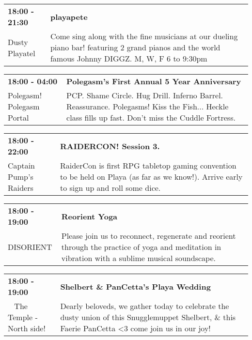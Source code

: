 \begin{tabular}{ p{1in} p{2.2in} }
    \textbf{18:00 - 21:30} & \textbf{playapete} \\
    Dusty Playatel \newline  & Come sing along with the fine musicians at our dueling piano bar! featuring 2 grand pianos and the world famous Johnny DIGGZ.  M, W, F  6 to 9:30pm \\
    \hline 
\end{tabular}
    
\begin{tabular}{ p{1in} p{2.2in} }
    \textbf{18:00 - 04:00} & \textbf{Polegasm's First Annual 5 Year Anniversary} \\
    Polegasm! \newline Polegasm Portal & PCP. Shame Circle. Hug Drill.
 Inferno Barrel. Reassurance. Polegasms!
Kiss the Fish...  Heckle class fills up fast. Don't miss the Cuddle Fortress. \\
    \hline 
\end{tabular}
    
\begin{tabular}{ p{1in} p{2.2in} }
    \textbf{18:00 - 22:00} & \textbf{RAIDERCON! Session 3.} \\
    Captain Pump's Raiders \newline  & RaiderCon is first RPG tabletop gaming convention to be held on Playa (as far as we know!). Arrive early to sign up and roll some dice. \\
    \hline 
\end{tabular}
    
\begin{tabular}{ p{1in} p{2.2in} }
    \textbf{18:00 - 19:00} & \textbf{Reorient Yoga} \\
    DISORIENT \newline  & Please join us to reconnect, regenerate and reorient through the practice of yoga and meditation in vibration with a sublime musical soundscape. \\
    \hline 
\end{tabular}
    
\begin{tabular}{ p{1in} p{2.2in} }
    \textbf{18:00 - 19:00} & \textbf{{\char9734} Shelbert \& PanCetta's Playa Wedding {\char9734}} \\
    ~ \newline The Temple - North side! & Dearly beloveds, we gather today to celebrate the dusty union of this Snugglemuppet Shelbert, \& this Faerie PanCetta <3 come join us in our joy! \\
    \hline 
\end{tabular}
    
